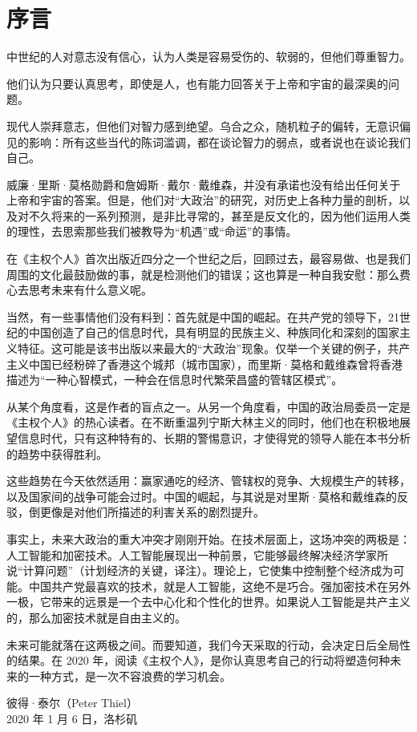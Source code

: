 \chapter{序言}

中世纪的人对意志没有信心，认为人类是容易受伤的、软弱的，但他们尊重智力。

他们认为只要认真思考，即使是人，也有能力回答关于上帝和宇宙的最深奥的问题。


现代人崇拜意志，但他们对智力感到绝望。乌合之众，随机粒子的偏转，无意识偏见的影响：所有这些当代的陈词滥调，都在谈论智力的弱点，或者说也在谈论我们自己。


威廉·里斯·莫格勋爵和詹姆斯·戴尔·戴维森，并没有承诺也没有给出任何关于上帝和宇宙的答案。但是，他们对“大政治”的研究，对历史上各种力量的剖析，以及对不久将来的一系列预测，是非比寻常的，甚至是反文化的，因为他们运用人类的理性，去思索那些我们被教导为“机遇”或“命运”的事情。


在《主权个人》首次出版近四分之一个世纪之后，回顾过去，最容易做、也是我们周围的文化最鼓励做的事，就是检测他们的错误；这也算是一种自我安慰：那么费心去思考未来有什么意义呢。


当然，有一些事情他们没有料到：首先就是中国的崛起。在共产党的领导下，21世纪的中国创造了自己的信息时代，具有明显的民族主义、种族同化和深刻的国家主义特征。这可能是该书出版以来最大的“大政治”现象。仅举一个关键的例子，共产主义中国已经粉碎了香港这个城邦（城市国家），而里斯·莫格和戴维森曾将香港描述为“一种心智模式，一种会在信息时代繁荣昌盛的管辖区模式”。

从某个角度看，这是作者的盲点之一。从另一个角度看，中国的政治局委员一定是《主权个人》的热心读者。在不断重温列宁斯大林主义的同时，他们也在积极地展望信息时代，只有这种特有的、长期的警惕意识，才使得党的领导人能在本书分析的趋势中获得胜利。


这些趋势在今天依然适用：赢家通吃的经济、管辖权的竞争、大规模生产的转移，以及国家间的战争可能会过时。中国的崛起，与其说是对里斯·莫格和戴维森的反驳，倒更像是对他们所描述的利害关系的剧烈提升。


事实上，未来大政治的重大冲突才刚刚开始。在技术层面上，这场冲突的两极是：人工智能和加密技术。人工智能展现出一种前景，它能够最终解决经济学家所说“计算问题”（计划经济的关键，译注）。理论上，它使集中控制整个经济成为可能。中国共产党最喜欢的技术，就是人工智能，这绝不是巧合。强加密技术在另外一极，它带来的远景是一个去中心化和个性化的世界。如果说人工智能是共产主义的，那么加密技术就是自由主义的。


未来可能就落在这两极之间。而要知道，我们今天采取的行动，会决定日后全局性的结果。在 2020 年，阅读《主权个人》，是你认真思考自己的行动将塑造何种未来的一种方式，是一次不容浪费的学习机会。

\begin{flushright}
\kaishu 彼得·泰尔（Peter Thiel）\\
2020 年 1 月 6 日，洛杉矶
\end{flushright} 
